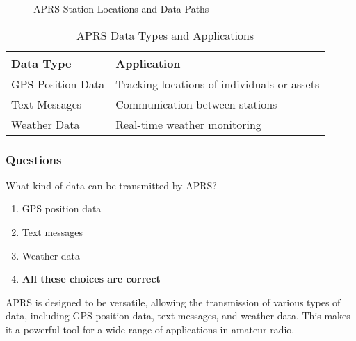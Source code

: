 \begin{figure}[h]
    \centering
    \caption{APRS Station Locations and Data Paths}
    \label{fig:aprs-map}
\end{figure}

\begin{table}[h]
    \centering
    \begin{tabular}{|l|l|}
        \hline
        \textbf{Data Type} & \textbf{Application} \\
        \hline
        GPS Position Data & Tracking locations of individuals or assets \\
        Text Messages & Communication between stations \\
        Weather Data & Real-time weather monitoring \\
        \hline
    \end{tabular}
    \caption{APRS Data Types and Applications}
    \label{tab:aprs-data-types}
\end{table}

\subsubsection{Questions}

\begin{tcolorbox}[colback=gray!10!white,colframe=black!75!black,title={T8D03}]
    What kind of data can be transmitted by APRS?
    \begin{enumerate}[label=\Alph*),noitemsep]
        \item GPS position data
        \item Text messages
        \item Weather data
        \item \textbf{All these choices are correct}
    \end{enumerate}
\end{tcolorbox}

APRS is designed to be versatile, allowing the transmission of various types of data, including GPS position data, text messages, and weather data. This makes it a powerful tool for a wide range of applications in amateur radio.

